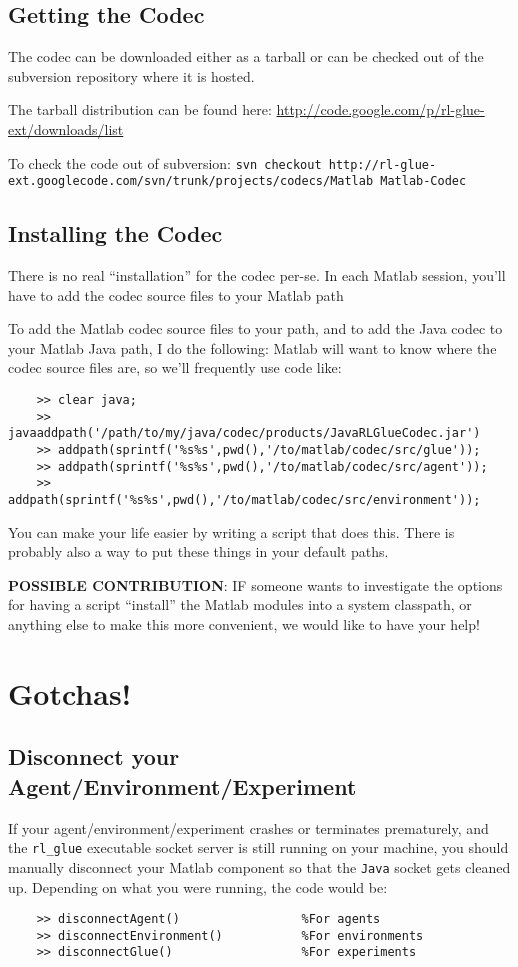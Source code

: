 \documentclass[11pt]{article}
\begin{document}
\subsection{Getting the Codec}
The codec can be downloaded either as a tarball or can be checked out of the subversion repository where it is hosted.

The tarball distribution can be found here:\newline
\url{http://code.google.com/p/rl-glue-ext/downloads/list}


To check the code out of subversion:\newline
\small \texttt{svn checkout http://rl-glue-ext.googlecode.com/svn/trunk/projects/codecs/Matlab Matlab-Codec} \normalsize

\subsection{Installing the Codec}
There is no real ``installation'' for the codec per-se.  In each Matlab session, you'll have to add the codec source files to your Matlab path

To add the Matlab codec source files to your path, and to add the Java codec to your Matlab Java path, I do the following:
Matlab will want to know where the codec source files are, so we'll frequently use code like:
\begin{verbatim}
	>> clear java;
	>> javaaddpath('/path/to/my/java/codec/products/JavaRLGlueCodec.jar')
	>> addpath(sprintf('%s%s',pwd(),'/to/matlab/codec/src/glue'));
	>> addpath(sprintf('%s%s',pwd(),'/to/matlab/codec/src/agent'));
	>> addpath(sprintf('%s%s',pwd(),'/to/matlab/codec/src/environment'));
\end{verbatim}

You can make your life easier by writing a script that does this.  There is probably also a way to put these things in your default paths.

\textbf{POSSIBLE CONTRIBUTION}: IF someone wants to investigate the options for having a script ``install'' the Matlab modules into a system classpath, or anything else
to make this more convenient, we would like to have your help!

\section{Gotchas!}
\subsection{Disconnect your Agent/Environment/Experiment}
If your agent/environment/experiment crashes or terminates prematurely, and the \texttt{rl\_glue} executable socket server is still running on your machine, you should
manually disconnect your Matlab component so that the \texttt{Java} socket gets cleaned up.  Depending on what you were running, the code would be:
\begin{verbatim}
	>> disconnectAgent()                 %For agents
	>> disconnectEnvironment()           %For environments
	>> disconnectGlue()                  %For experiments
\end{verbatim}
\end{document}
